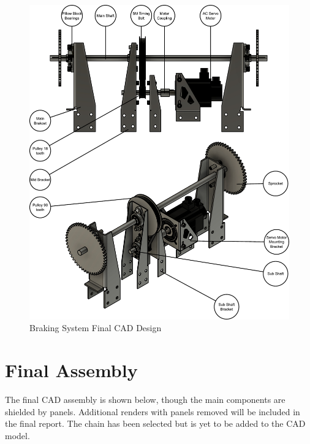 \begin{figure}[H]
    \centering
    \includegraphics[width=0.8\linewidth]{figs/final_design/BrakingSyst.pdf}
    \caption{Braking System Final CAD Design}
    \label{fig:brake-system-final-design}
\end{figure}

\section{Final Assembly}

The final CAD assembly is shown below, though the main components are shielded by panels. Additional renders with panels removed will be included in the final report. The chain has been selected but is yet to be added to the CAD model.

